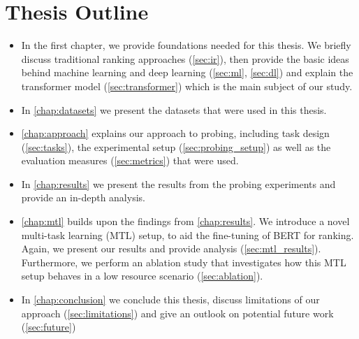 \section{Thesis Outline}
\begin{itemize}
    \item In the first chapter, we provide foundations needed for this thesis. We briefly discuss traditional ranking approaches (\autoref{sec:ir}), then provide the basic ideas behind machine learning and deep learning (\autoref{sec:ml}, \autoref{sec:dl}) and explain the transformer model (\autoref{sec:transformer}) which is the main subject of our study.
    \item In \autoref{chap:datasets} we present the datasets that were used in this thesis.
    \item \autoref{chap:approach} explains our approach to probing, including task design (\autoref{sec:tasks}), the experimental setup (\autoref{sec:probing_setup}) as well as the evaluation measures (\autoref{sec:metrics}) that were used.
    \item In \autoref{chap:results} we present the results from the probing experiments and provide an in-depth analysis.
    \item \autoref{chap:mtl} builds upon the findings from \autoref{chap:results}. We introduce a novel multi-task learning (MTL) setup, to aid the fine-tuning of BERT for ranking. Again, we present our results and provide analysis (\autoref{sec:mtl_results}). Furthermore, we perform an ablation study that investigates how this MTL setup behaves in a low resource scenario (\autoref{sec:ablation}).
    \item In \autoref{chap:conclusion} we conclude this thesis, discuss limitations of our approach (\autoref{sec:limitations}) and give an outlook on potential future work (\autoref{sec:future})
\end{itemize}

